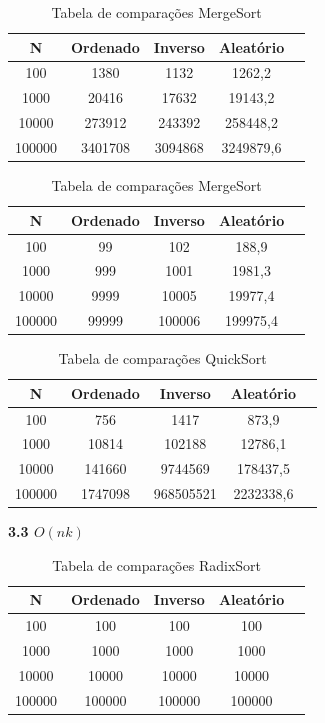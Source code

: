 \documentclass[10pt]{article}
\begin{document}
\begin{table}[H]
  \parbox{.45\linewidth}{
    \centering
    \caption{Tabela de comparações HeapSort}
    \begin{tabular}{|c|c|c|c|c|}
    \hline
    N & Ordenado & Inverso & Aleatório \\ \hline
    100 & 1380 & 1132 & 1262,2 \\ \hline
    1000 & 20416 & 17632 & 19143,2 \\ \hline
    10000 & 273912 & 243392 & 258448,2 \\ \hline
    100000 & 3401708 & 3094868 & 3249879,6 \\ \hline
    \end{tabular}
  }
  \hfill
  \parbox{.45\linewidth}{
    \centering
    \caption{Tabela de comparações MergeSort}
    \begin{tabular}{|c|c|c|c|c|}
    \hline
    N & Ordenado & Inverso & Aleatório \\ \hline
    100 & 99 & 102 & 188,9 \\ \hline
    1000 & 999 & 1001 & 1981,3 \\ \hline
    10000 & 9999 & 10005 & 19977,4 \\ \hline
    100000 & 99999 & 100006 & 199975,4 \\ \hline
    \end{tabular}
  }
\end{table}

\begin{table}[H]
  \centering
  \caption{Tabela de comparações QuickSort}
  \begin{tabular}{|c|c|c|c|c|}
  \hline
  N & Ordenado & Inverso & Aleatório \\ \hline
  100 & 756 & 1417 & 873,9 \\ \hline
  1000 & 10814 & 102188 & 12786,1 \\ \hline
  10000 & 141660 & 9744569 & 178437,5 \\ \hline
  100000 & 1747098 & 968505521 & 2232338,6 \\ \hline
  \end{tabular}
\end{table}

\vspace{0.5cm}

\textbf{3.3 $O(n k)$}

\begin{table}[H]
  \centering
  \caption{Tabela de comparações RadixSort}
  \begin{tabular}{|c|c|c|c|c|}
  \hline
  N & Ordenado & Inverso & Aleatório \\ \hline
  100 & 100 & 100 & 100 \\ \hline
  1000 & 1000 & 1000 & 1000 \\ \hline
  10000 & 10000 & 10000 & 10000 \\ \hline
  100000 & 100000 & 100000 & 100000 \\ \hline
  \end{tabular}
\end{table}
\end{document}
